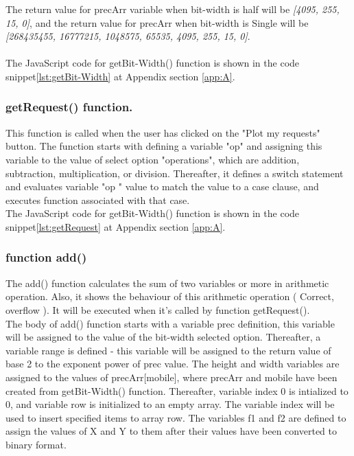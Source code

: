 \documentclass[11pt]{article}
\begin{document}
The return value for precArr variable when bit-width is half will be \textit{[4095, 255, 15, 0]}, and the return value for precArr when bit-width is Single will be \textit{[268435455, 16777215, 1048575, 65535, 4095, 255, 15, 0]}.\\
\\The JavaScript code for getBit-Width() function is shown in the code snippet\ref{lst:getBit-Width} at Appendix section \ref{app:A}.\\

\subsubsection{getRequest() function.} 
This function is called when the user has clicked on the "Plot my requests" button. The function starts with defining a variable "op" and assigning this variable to the value of select option "operations", which are addition, subtraction, multiplication, or division. Thereafter, it defines a switch statement and evaluates variable "op " value to match the value to a case clause, and executes function associated with that case.\\
The JavaScript code for getBit-Width() function is shown in the code snippet\ref{lst:getRequest} at Appendix section \ref{app:A}.\\

\subsubsection{function add()}
The add() function calculates the sum of two variables or more in arithmetic operation. Also, it shows the behaviour of this arithmetic operation ( Correct, overflow ). It will be executed when it's called by function getRequest().\\
The body of add() function starts with a variable prec definition, this variable will be assigned to the value of the bit-width selected option. Thereafter, a variable range is defined - this variable will be assigned to the return value of base 2 to the exponent power of prec value.
The height and width variables are assigned to the values of precArr[mobile], where precArr and mobile have been created from getBit-Width() function.
Thereafter, variable index 0 is intialized to 0, and variable row is initialized to an empty array. The variable index will be used to insert specified items to array row. The variables f1 and f2 are defined to assign the values of X and Y to them after their values have been converted to binary format.\\
\end{document}
